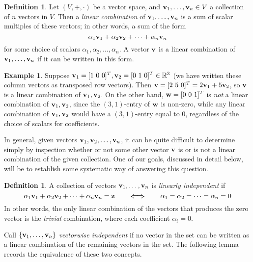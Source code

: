 \documentclass[11pt,notitlepage]{article}
\numberwithin{equation}{section}
\theoremstyle{plain}
\theoremstyle{definition}
\newtheorem{definition}[equation]{Definition}
\newtheorem{example}[equation]{Example}
\begin{document}
\begin{definition} Let $(V,+,\cdot)$ be a vector space, and ${\bf v}_1,\dots, {\bf v}_n\in V$ a collection of $n$ vectors in $V$. Then a {\it linear combination} of ${\bf v}_1,\dots,{\bf v}_n$ is a sum of scalar multiples of these vectors; in other words, a sum of the form
\begin{equation}
\alpha_1{\bf v}_1 + \alpha_2{\bf v}_2 +\dots + \alpha_n{\bf v}_n
\end{equation}
for some choice of scalars $\alpha_1,\alpha_2,\dots,\alpha_n$. A vector ${\bf v}$ is a linear combination of ${\bf v}_1,\dots,{\bf v}_n$ if it can be written in this form. 
\end{definition}

\begin{example} Suppose ${\bf v}_1 = [1\ 0\ 0]^T, {\bf v}_2 = [0\ 1\ 0]^T\in\mathbb R^3$ (we have written these column vectors as transposed row vectors). Then ${\bf v} = [2\ 5\ 0]^T = 2{\bf v}_1 + 5{\bf v}_2$, so ${\bf v}$ is a linear combination of ${\bf v}_1,{\bf v}_2$. On the other hand, ${\bf w} = [0\ 0\ 1]^T$ is {\it not} a linear combination of ${\bf v}_1,{\bf v}_2$, since the $(3,1)$-entry of ${\bf w}$ is non-zero, while any linear combination of ${\bf v}_1,{\bf v}_2$ would have a $(3,1)$-entry equal to $0$, regardless of the choice of scalars for coefficients.
\end{example}

In general, given vectors ${\bf v}_1,{\bf v}_2,\dots,{\bf v}_n$, it can be quite difficult to determine simply by inspection whether or not some other vector ${\bf v}$ is or is not a linear combination of the given collection. One of our goals, discussed in detail below, will be to establish some systematic way of answering this question.

\begin{definition} A collection of vectors ${\bf v}_1,\dots,{\bf v}_n$ is {\it linearly independent} if
\begin{equation}
\alpha_1{\bf v}_1 + \alpha_2{\bf v}_2 +\dots + \alpha_n{\bf v}_n = {\bf z}\qquad \boldsymbol{\Longleftrightarrow}\qquad \alpha_1 = \alpha_2 = \dots = \alpha_n = 0
\end{equation}
In other words, the only linear combination of the vectors that produces the zero vector is the {\it trivial} combination, where each coefficient $\alpha_i = 0$.
\end{definition}

Call $\{{\bf v}_1,\dots,{\bf v}_n\}$ {\it vectorwise independent} if no vector in the set can be written as a linear combination of the remaining vectors in the set. The following lemma records the equivalence of these two concepts.
\end{document}
